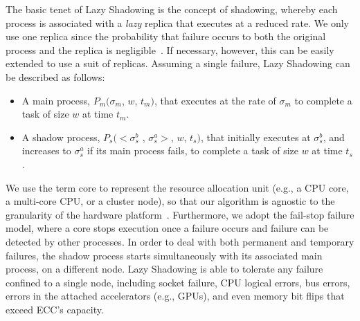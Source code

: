 The basic tenet of Lazy Shadowing is the concept of shadowing, whereby each process is associated with a {\it lazy} replica that executes at a reduced rate. We only use one replica since the probability that failure occurs to both the original process and the replica is negligible~\cite{casanova_inria_2012}. %
If necessary, however, this can be easily extended to use a suit of replicas. Assuming a single failure, Lazy Shadowing can be described as follows:
\begin{itemize}
	\item A main process, $P_m(\sigma_m$, $w$, $t_m)$, that executes at the rate of $\sigma_m$ to complete a task of size $w$ at time $t_m$.
	\item A shadow process, $P_s(<\sigma_s^b$ , $\sigma_s^a>$, $w$, $t_s)$, that initially executes at $\sigma_s^b$, and increases to $\sigma_s^a$ if its main process fails, to complete a task of size $w$ at time $t_s$.%
\end{itemize}


We use the term core to represent the resource allocation unit (e.g., a
CPU core, a multi-core CPU, or a cluster node), so that our algorithm is agnostic to the
granularity of the hardware platform~\cite{casanova_inria_2012}.
Furthermore, we adopt the
fail-stop failure model, where a core stops execution once a failure
occurs and failure can be detected by other
processes\cite{gartner_faults_1999,cristian_comm_1991}.
In order to deal with both permanent and temporary failures, the shadow process starts simultaneously with its associated main process, on a different node. Lazy Shadowing is able to tolerate any failure confined to a single node, including socket failure, CPU logical errors, bus errors, errors in the attached accelerators (e.g., GPUs), and even memory bit flips that exceed ECC's capacity. 

